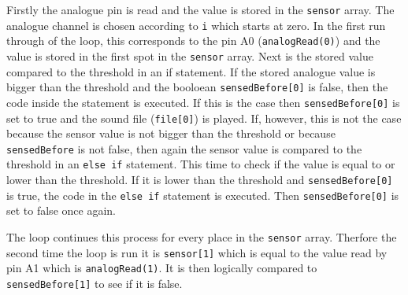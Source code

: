 Firstly the analogue pin is read and the value is stored in the \texttt{sensor} array. The analogue channel is chosen according to \texttt{i} which starts at zero. In the first run through of the loop, this corresponds to the pin A0 (\texttt{analogRead(0)}) and the value is stored in the first spot in the \texttt{sensor} array. Next is the stored value compared to the threshold in an if statement. If  the stored analogue value is bigger than the threshold and the booloean \texttt{sensedBefore[0]} is false, then the code inside the statement is executed. If this is the case then \texttt{sensedBefore[0]} is set to true and the sound file (\texttt{file[0]}) is played. If, however, this is not the case because the sensor value is not bigger than the threshold or because \texttt{sensedBefore} is not false, then again the sensor value is compared to the threshold in an \texttt{else if} statement. This time to check if the value is equal to or lower than the threshold. If it is lower than the threshold and \texttt{sensedBefore[0]} is true, the code in the \texttt{else if} statement is executed. Then \texttt{sensedBefore[0]} is set to false once again.


The loop continues this process for every place in the \texttt{sensor} array. Therfore the second time the loop is run it is \texttt{sensor[1]} which is equal to the value read by pin A1 which is \texttt{analogRead(1)}. It is then logically compared to \texttt{sensedBefore[1]} to see if it is false.

